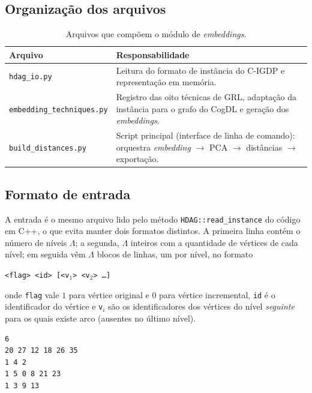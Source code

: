 \documentclass[12pt,a4paper]{article}
\begin{document}
\subsection{Organização dos arquivos}

\begin{table}[htbp]
\centering
\small
\begin{tabularx}{\textwidth}{@{}lX@{}}
\toprule
\textbf{Arquivo} & \textbf{Responsabilidade} \\
\midrule
\texttt{hdag\_io.py} &
  Leitura do formato de instância do C-IGDP e representação em memória. \\
\texttt{embedding\_techniques.py} &
  Registro das oito técnicas de GRL, adaptação da instância para o grafo
  do CogDL e geração dos \textit{embeddings}. \\
\texttt{build\_distances.py} &
  Script principal (interface de linha de comando): orquestra
  \textit{embedding} $\rightarrow$ PCA $\rightarrow$ distâncias
  $\rightarrow$ exportação. \\
\bottomrule
\end{tabularx}
\caption{Arquivos que compõem o módulo de \textit{embeddings}.}
\label{tab:arquivos}
\end{table}

\subsection{Formato de entrada}

A entrada é o mesmo arquivo lido pelo método \texttt{HDAG::read\_instance}
do código em C++, o que evita manter dois formatos distintos. A primeira
linha contém o número de níveis $\Lambda$; a segunda, $\Lambda$ inteiros
com a quantidade de vértices de cada nível; em seguida vêm $\Lambda$
blocos de linhas, um por nível, no formato

\begin{center}
\texttt{<flag> <id> [<v$_1$> <v$_2$> \ldots]}
\end{center}

\noindent onde \texttt{flag} vale $1$ para vértice original e $0$ para
vértice incremental, \texttt{id} é o identificador do vértice e
\texttt{v}$_i$ são os identificadores dos vértices do nível
\emph{seguinte} para os quais existe arco (ausentes no último nível).

\begin{lstlisting}[caption={Trecho de \texttt{incgraph\_6\_0.06\_5\_30\_1.20\_1.txt}.},captionpos=b]
6
20 27 12 18 26 35
1 4 2
1 5 0 8 21 23
1 3 9 13
\end{lstlisting}
\end{document}
